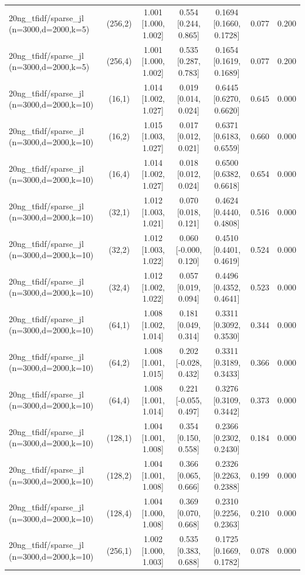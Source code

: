 \begin{tabular}{lcccccc}
20ng\_tfidf/sparse\_jl (n=3000,d=2000,k=5) & (256,2) & 1.001 [1.000, 1.002] & 0.554 [0.244, 0.865] & 0.1694 [0.1660, 0.1728] & 0.077 & 0.200 \\
20ng\_tfidf/sparse\_jl (n=3000,d=2000,k=5) & (256,4) & 1.001 [1.000, 1.002] & 0.535 [0.287, 0.783] & 0.1654 [0.1619, 0.1689] & 0.077 & 0.200 \\
20ng\_tfidf/sparse\_jl (n=3000,d=2000,k=10) & (16,1) & 1.014 [1.002, 1.027] & 0.019 [0.014, 0.024] & 0.6445 [0.6270, 0.6620] & 0.645 & 0.000 \\
20ng\_tfidf/sparse\_jl (n=3000,d=2000,k=10) & (16,2) & 1.015 [1.003, 1.027] & 0.017 [0.012, 0.021] & 0.6371 [0.6183, 0.6559] & 0.660 & 0.000 \\
20ng\_tfidf/sparse\_jl (n=3000,d=2000,k=10) & (16,4) & 1.014 [1.002, 1.027] & 0.018 [0.012, 0.024] & 0.6500 [0.6382, 0.6618] & 0.654 & 0.000 \\
20ng\_tfidf/sparse\_jl (n=3000,d=2000,k=10) & (32,1) & 1.012 [1.003, 1.021] & 0.070 [0.018, 0.121] & 0.4624 [0.4440, 0.4808] & 0.516 & 0.000 \\
20ng\_tfidf/sparse\_jl (n=3000,d=2000,k=10) & (32,2) & 1.012 [1.003, 1.022] & 0.060 [-0.000, 0.120] & 0.4510 [0.4401, 0.4619] & 0.524 & 0.000 \\
20ng\_tfidf/sparse\_jl (n=3000,d=2000,k=10) & (32,4) & 1.012 [1.002, 1.022] & 0.057 [0.019, 0.094] & 0.4496 [0.4352, 0.4641] & 0.523 & 0.000 \\
20ng\_tfidf/sparse\_jl (n=3000,d=2000,k=10) & (64,1) & 1.008 [1.002, 1.014] & 0.181 [0.049, 0.314] & 0.3311 [0.3092, 0.3530] & 0.344 & 0.000 \\
20ng\_tfidf/sparse\_jl (n=3000,d=2000,k=10) & (64,2) & 1.008 [1.001, 1.015] & 0.202 [-0.028, 0.432] & 0.3311 [0.3189, 0.3433] & 0.366 & 0.000 \\
20ng\_tfidf/sparse\_jl (n=3000,d=2000,k=10) & (64,4) & 1.008 [1.001, 1.014] & 0.221 [-0.055, 0.497] & 0.3276 [0.3109, 0.3442] & 0.373 & 0.000 \\
20ng\_tfidf/sparse\_jl (n=3000,d=2000,k=10) & (128,1) & 1.004 [1.001, 1.008] & 0.354 [0.150, 0.558] & 0.2366 [0.2302, 0.2430] & 0.184 & 0.000 \\
20ng\_tfidf/sparse\_jl (n=3000,d=2000,k=10) & (128,2) & 1.004 [1.001, 1.008] & 0.366 [0.065, 0.666] & 0.2326 [0.2263, 0.2388] & 0.199 & 0.000 \\
20ng\_tfidf/sparse\_jl (n=3000,d=2000,k=10) & (128,4) & 1.004 [1.000, 1.008] & 0.369 [0.070, 0.668] & 0.2310 [0.2256, 0.2363] & 0.210 & 0.000 \\
20ng\_tfidf/sparse\_jl (n=3000,d=2000,k=10) & (256,1) & 1.002 [1.000, 1.003] & 0.535 [0.383, 0.688] & 0.1725 [0.1669, 0.1782] & 0.078 & 0.000 \\

\end{tabular}
